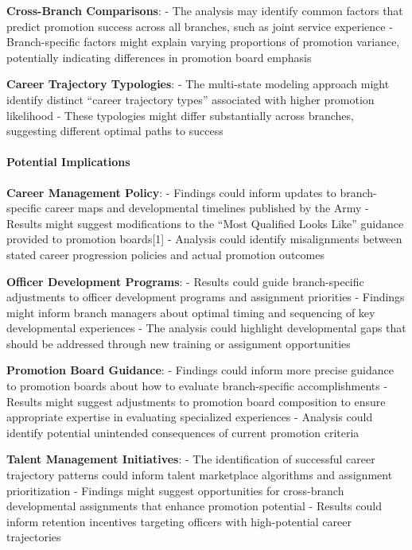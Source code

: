 \documentclass[./main.tex]{subfiles}
\begin{document}
\textbf{Cross-Branch Comparisons}: - The analysis may identify common
factors that predict promotion success across all branches, such as
joint service experience - Branch-specific factors might explain varying
proportions of promotion variance, potentially indicating differences in
promotion board emphasis

\textbf{Career Trajectory Typologies}: - The multi-state modeling
approach might identify distinct ``career trajectory types'' associated
with higher promotion likelihood - These typologies might differ
substantially across branches, suggesting different optimal paths to
success

\paragraph{Potential Implications}\label{potential-implications}

\textbf{Career Management Policy}: - Findings could inform updates to
branch-specific career maps and developmental timelines published by the
Army - Results might suggest modifications to the ``Most Qualified Looks
Like'' guidance provided to promotion boards{[}1{]} - Analysis could
identify misalignments between stated career progression policies and
actual promotion outcomes

\textbf{Officer Development Programs}: - Results could guide
branch-specific adjustments to officer development programs and
assignment priorities - Findings might inform branch managers about
optimal timing and sequencing of key developmental experiences - The
analysis could highlight developmental gaps that should be addressed
through new training or assignment opportunities

\textbf{Promotion Board Guidance}: - Findings could inform more precise
guidance to promotion boards about how to evaluate branch-specific
accomplishments - Results might suggest adjustments to promotion board
composition to ensure appropriate expertise in evaluating specialized
experiences - Analysis could identify potential unintended consequences
of current promotion criteria

\textbf{Talent Management Initiatives}: - The identification of
successful career trajectory patterns could inform talent marketplace
algorithms and assignment prioritization - Findings might suggest
opportunities for cross-branch developmental assignments that enhance
promotion potential - Results could inform retention incentives
targeting officers with high-potential career trajectories
\end{document}
